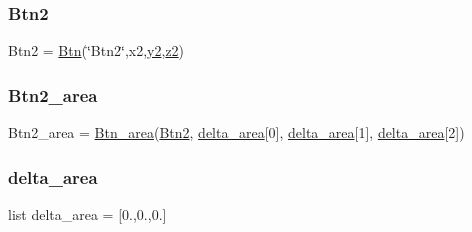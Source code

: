 \mbox{\label{namespaceRET__config_a73afa8c52cebd94e1889df5fbe3bec66}} 
\subsubsection{\texorpdfstring{Btn2}{Btn2}}
{\footnotesize\ttfamily Btn2 = \hyperlink{classRET__config_1_1Btn}{Btn}(\char`\"{}Btn2\char`\"{},x2,\hyperlink{namespaceRET__config_a07bcd014e69eddcf4243b2a961014eaf}{y2},\hyperlink{namespaceRET__config_a55196b87940893e540ba636218f4eb07}{z2})}

\mbox{\label{namespaceRET__config_a51a4083768cbc17b22a98ad63a7bf851}} 
\subsubsection{\texorpdfstring{Btn2\+\_\+area}{Btn2\_area}}
{\footnotesize\ttfamily Btn2\+\_\+area = \hyperlink{classRET__config_1_1Btn__area}{Btn\+\_\+area}(\hyperlink{namespaceRET__config_a73afa8c52cebd94e1889df5fbe3bec66}{Btn2}, \hyperlink{namespaceRET__config_abbf3fd8fafae6a457e57109bfaf9a6c5}{delta\+\_\+area}\mbox{[}0\mbox{]}, \hyperlink{namespaceRET__config_abbf3fd8fafae6a457e57109bfaf9a6c5}{delta\+\_\+area}\mbox{[}1\mbox{]}, \hyperlink{namespaceRET__config_abbf3fd8fafae6a457e57109bfaf9a6c5}{delta\+\_\+area}\mbox{[}2\mbox{]})}

\mbox{\label{namespaceRET__config_abbf3fd8fafae6a457e57109bfaf9a6c5}} 
\subsubsection{\texorpdfstring{delta\+\_\+area}{delta\_area}}
{\footnotesize\ttfamily list delta\+\_\+area = \mbox{[}0.,0.,0.\mbox{]}}

\mbox{\label{namespaceRET__config_a6297da7d9cbabcbe91effb0271677ff3}} 
